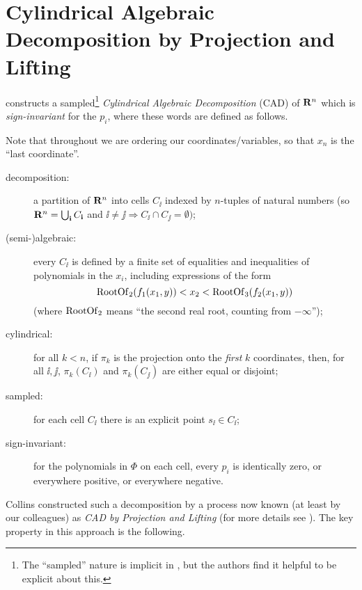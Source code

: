 \documentclass[runningheads,a4paper]{llncs}
\begin{document}
\section{Cylindrical Algebraic Decomposition by Projection and Lifting}
\label{sec:PL}

\cite{Collins1975} constructs a sampled\footnote{The ``sampled'' nature is implicit in \cite[and its successors]{Collins1975}, but the authors find it helpful to be explicit about this.} \emph{Cylindrical Algebraic Decomposition} (CAD) of ${\mathbf R}^n$ which is \emph{sign-invariant} for the $p_i$, where these words are defined as follows.
\begin{definition}\label{def:cad}
Note that throughout we are ordering our coordinates/\allowbreak{}vari\-ables, so that $x_n$ is the ``last coordinate''.
\begin{description}
\item[decomposition:] a partition of ${\mathbf R}^n$ into cells $C_\ii$ indexed by $n$-tuples of natural numbers (so ${\mathbf R}^n=\bigcup_{\bf i} C_{\bf i}$ and $\ii\ne\jj\Rightarrow C_\ii\cap C_\jj=\emptyset)$;
\item[{\rm(semi-)}algebraic:] every $C_\ii$ is defined by a finite set of equalities and inequalities of polynomials in the $x_i$, including expressions of the form
\begin{equation}\label{eq:RootOf}
\mathop{\rm RootOf}\nolimits_2(f_1(x_1,y))<x_2<\mathop{\rm RootOf}\nolimits_3(f_2(x_1,y)) 
\end{equation}
(where $\mathop{\rm RootOf}\nolimits_2$ means ``the second real root, counting from $-\infty$'');
\item[cylindrical:] for all $k<n$, if $\pi_k$ is the projection onto the \emph{first} $k$ coordinates, then, for all $\ii,\jj$, $\pi_k(C_\ii)$ and $\pi_k(C_\jj)$ are either equal or disjoint;
\item[sampled:] for each cell $C_\ii$ there is an explicit point $s_\ii\in C_\ii$;
\item[sign-invariant:] for the polynomials in $\Phi$ on each cell, every $p_i$ is identically zero, or everywhere positive, or everywhere negative.
\end{description}
\end{definition}
Collins constructed such a decomposition by a process now known (at least by our colleagues) as \emph{CAD by Projection and Lifting} (for more details see \cite{Davenport2015c}).  The key property in this approach is the following.
\end{document}
